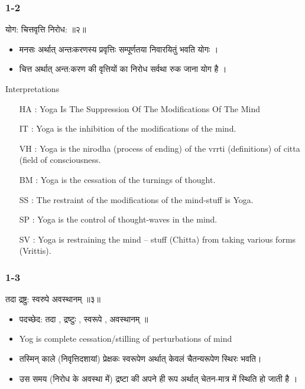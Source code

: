 \begin{frame}[fragile]\frametitle{1-2}

\begin{sanskrit}
योग: चित्तवृत्ति निरोध:  ॥२॥
\end{sanskrit}

\begin{itemize}
\item  मनसः अर्थात् अन्तःकरणस्य प्रवृत्तिः सम्पूर्णतया निवारयितुं भवति योगः ।
\item चित्त अर्थात् अन्त:करण की वृत्तियों का निरोध सर्वथा रुक जाना योग है ।	
\end{itemize}

Interpretations
\begin{itemize}		
\item [HA]: Yoga Is The Suppression Of The Modifications Of The Mind
\item [IT]: Yoga is the inhibition of the modifications of the mind.
\item [VH]: Yoga is the nirodha (process of ending) of the vrrti (definitions) of citta (field of consciousness.
\item [BM]: Yoga is the cessation of the turnings of thought.
\item [SS]: The restraint of the modifications of the mind-stuff is Yoga.
\item [SP]: Yoga is the control of thought-waves in the mind.
\item [SV]: Yoga is restraining the mind – stuff (Chitta) from taking various forms (Vrittis).
\end{itemize}

\end{frame}

\begin{frame}[fragile]\frametitle{1-3}

\begin{sanskrit}
तदा द्रष्टु: स्वरुपे अवस्थानम् ॥३॥
\end{sanskrit}


\begin{itemize}
\item पदच्छेद: तदा , द्रष्टुः , स्वरूपे , अवस्थानम् ॥
\item Yog is complete cessation/stilling of perturbations of mind
\item  तस्मिन् काले (निवृत्तिदशायां) प्रेक्षकः स्वरूपेण अर्थात् केवलं चैतन्यरूपेण स्थिरः भवति।
\item उस समय (निरोध के अवस्था में) द्रष्टा की अपने ही रूप अर्थात् चेतन-मात्र में स्थिति हो जाती है ।		
\end{itemize}

\end{frame}


